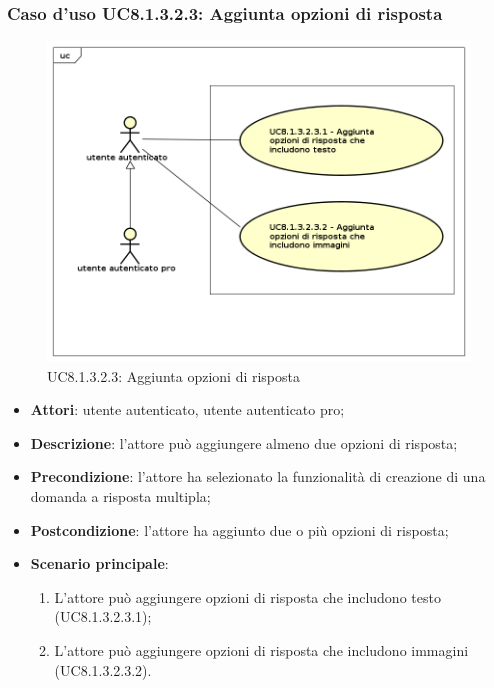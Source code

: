 \subsubsection{Caso d'uso UC8.1.3.2.3: Aggiunta opzioni di risposta}
	\label{UC8.1.3.2.3}
	\begin{figure}[h]
		\centering
			\includegraphics[scale=0.45,keepaspectratio]{UML/UC8_1_3_2_3.png}
		\caption{UC8.1.3.2.3: Aggiunta opzioni di risposta}
	\end{figure}
	\FloatBarrier
	\begin{itemize}
		\item
			\textbf{Attori}: utente autenticato, utente autenticato pro;
		\item		
			\textbf{Descrizione}: l'attore può aggiungere almeno due opzioni di risposta;
		\item
			\textbf{Precondizione}: l'attore ha selezionato la funzionalità di creazione di una domanda a risposta multipla; 
		\item
			\textbf{Postcondizione}: l'attore ha aggiunto due o più opzioni di risposta;
		\item
			\textbf{Scenario principale}:
	       		\begin{enumerate}
	       			\item
	       			L'attore può aggiungere opzioni di risposta che includono testo (UC8.1.3.2.3.1);
					\item
					L'attore può aggiungere opzioni di risposta che includono immagini (UC8.1.3.2.3.2).
	 			\end{enumerate}
	\end{itemize}	
	
